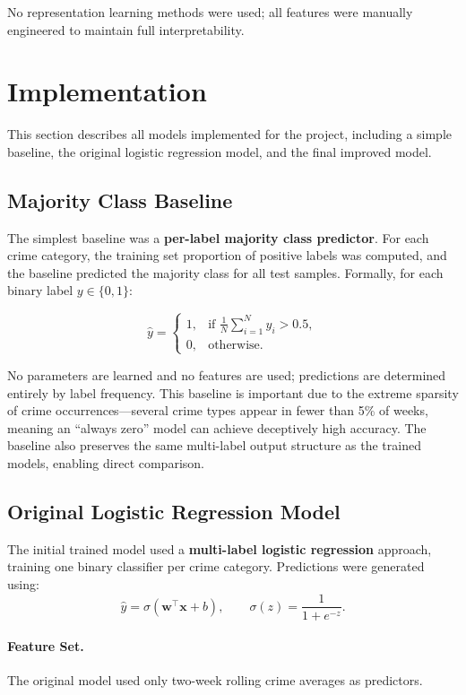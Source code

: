 \documentclass[11pt]{article}
\begin{document}
No representation learning methods were used; all features were manually engineered to maintain full interpretability.


\section{Implementation}

This section describes all models implemented for the project, including a simple baseline, the original logistic regression model, and the final improved model. 

\subsection{Majority Class Baseline}

The simplest baseline was a \textbf{per-label majority class predictor}. For each crime category, the training set proportion of positive labels was computed, and the baseline predicted the majority class for all test samples. Formally, for each binary label $y \in \{0,1\}$:

\[
\hat{y} =
\begin{cases}
1, & \text{if } \frac{1}{N}\sum_{i=1}^N y_i > 0.5, \\
0, & \text{otherwise}.
\end{cases}
\]

No parameters are learned and no features are used; predictions are determined entirely by label frequency.  
This baseline is important due to the extreme sparsity of crime occurrences—several crime types appear in fewer than 5\% of weeks, meaning an ``always zero'' model can achieve deceptively high accuracy.  
The baseline also preserves the same multi-label output structure as the trained models, enabling direct comparison.

\subsection{Original Logistic Regression Model}

The initial trained model used a \textbf{multi-label logistic regression} approach, training one binary classifier per crime category. Predictions were generated using:
\[
\hat{y} = \sigma(\mathbf{w}^\top \mathbf{x} + b),
\qquad 
\sigma(z) = \frac{1}{1 + e^{-z}}.
\]

\paragraph{Feature Set.}
The original model used only two-week rolling crime averages as predictors.
\end{document}
